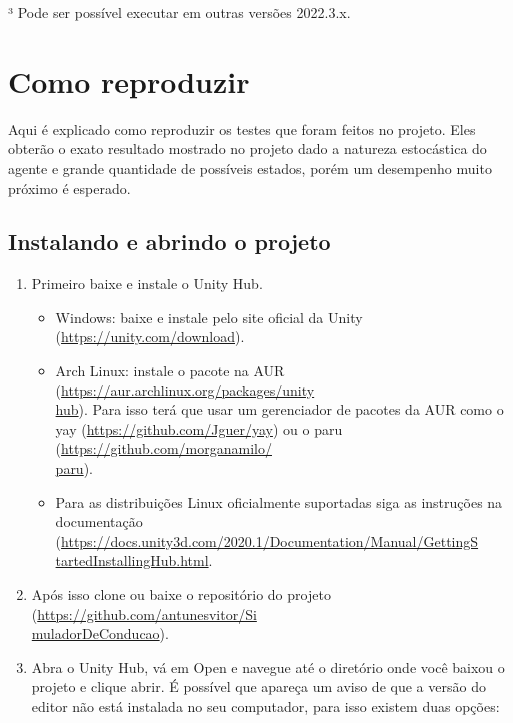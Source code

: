 \begin{apendicesenv}
³ Pode ser possível executar em outras versões 2022.3.x.

\section*{Como reproduzir} 
Aqui é explicado como reproduzir os testes que foram feitos no projeto. Eles obterão o exato resultado mostrado no projeto dado a natureza estocástica do agente e grande quantidade de possíveis estados, porém um desempenho muito próximo é esperado.

\subsection*{Instalando e abrindo o projeto}

 \begin{enumerate}
    \item Primeiro baixe e instale o Unity Hub.
    \begin{itemize}
        \item Windows: baixe e instale pelo site oficial da Unity (\href{https://unity.com/download}{https://unity.com/download}).
        \item Arch Linux: instale o pacote na AUR (\href{https://aur.archlinux.org/packages/unityhub}{https://aur.archlinux.org/packages/unity\\hub}). Para isso terá que usar um gerenciador de pacotes da AUR como o yay (\href{https://github.com/Jguer/yay}{https://github.com/Jguer/yay}) ou o paru (\href{https://github.com/morganamilo/paru}{https://github.com/morganamilo/\\paru}).
        \item Para as distribuições Linux oficialmente suportadas siga as instruções na documentação (\href{https://docs.unity3d.com/2020.1/Documentation/Manual/GettingStartedInstallingHub.html}{https://docs.unity3d.com/2020.1/Documentation/Manual/GettingS\\tartedInstallingHub.html}.
    \end{itemize}
    \item Após isso clone ou baixe o repositório do projeto (\href{https://github.com/antunesvitor/SimuladorDeConducao}{https://github.com/antunesvitor/Si\\muladorDeConducao}).
    \item Abra o Unity Hub, vá em Open e navegue até o diretório onde você baixou o projeto e clique abrir. É possível que apareça um aviso de que a versão do editor não está instalada no seu computador, para isso existem duas opções:

\end{enumerate}
\end{apendicesenv}
